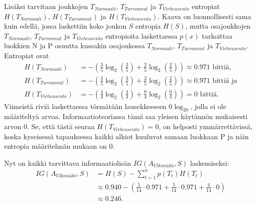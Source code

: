 \documentclass[12pt,finnish]{tktltiki2}
\theoremstyle{definition}
\theoremstyle{remark}
\begin{document}
Lisäksi tarvitaan joukkojen $T_{Normaali}$, $T_{Turvonnut}$ ja $T_{Virheasento}$ entropiat $H(T_{Normaali})$, $H(T_{Turvonnut})$
ja $H(T_{Virheasento})$. Kaava on luonnollisesti sama kuin edellä, jossa laskettiin koko joukon $S$ entropia $H(S)$, mutta
osajoukkojen $T_{Normaali}$, $T_{Turvonnut}$ ja $T_{Virheasento}$ entropioita laskettaessa $p(x)$
tarkoittaa luokkien N ja P osuutta kussakin osajoukossa $T_{Normaali}$, $T_{Turvonnut}$ ja $T_{Virheasento}$.
Entropiat ovat
\begin{equation*}
\begin{split}
H(T_{Normaali}) &= -\left(\frac{3}{5}\log_2\left(\frac{3}{5}\right) + \frac{2}{5}\log_2\left(\frac{2}{5}\right)\right) \approx 0.971 \mbox{ bittiä,} \\
H(T_{Turvonnut}) &= -\left(\frac{3}{5}\log_2\left(\frac{3}{5}\right) + \frac{2}{5}\log_2\left(\frac{2}{5}\right)\right) \approx 0.971 \mbox{ bittiä ja} \\ 
H(T_{Virheasento}) &= -\left(\frac{4}{4}\log_2\left(\frac{4}{4}\right) + \frac{0}{4}\log_2\left(\frac{0}{4}\right)\right) = 0 \mbox{ bittiä.}
\end{split}
\end{equation*}
Viimeistä riviä laskettaessa törmätään lausekkeeseen $0\log_20$, jolla ei ole määriteltyä arvoa. Informaatioteoriassa tämä saa yleisen
käytännön mukaisesti arvon 0. Se, että tästä seuraa $H(T_{Virheasento}) = 0$, on helposti ymmärrettävissä, koska kyseisessä tapauksessa
kaikki alkiot kuuluvat samaan luokkaan P ja näin entropia määritelmän mukaan on $0$.

Nyt on kaikki tarvittava informaatiolisän $IG(A_{\textit{Ulkonäkö}},S)$ laskemiseksi:
\begin{equation*}
\begin{split}
IG(A_{\textit{Ulkonäkö}},S) &= H(S) -\sum_{t = 1}^{n} p(T_t)H(T_t) \\
		   &\approx 0.940 - \left( \frac{5}{14}\cdot0.971 + \frac{5}{14}\cdot0.971  + \frac{4}{14}\cdot0 \right) \\
                   &\approx 0.246.
\end{split}
\end{equation*}
\end{document}
